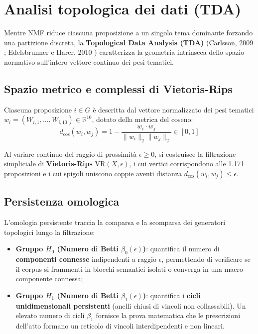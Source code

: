 \documentclass[12pt,a4paper,oneside]{report}
\begin{document}
\section{Analisi topologica dei dati (TDA)}
\label{sec:tda_metodologia}

Mentre NMF riduce ciascuna proposizione a un singolo tema dominante forzando una partizione discreta, la \textbf{Topological Data Analysis (TDA)} (Carlsson, 2009 \cite{carlsson2009topology}; Edelsbrunner e Harer, 2010 \cite{edelsbrunner2010computational}) caratterizza la geometria intrinseca dello spazio normativo sull'intero vettore continuo dei pesi tematici.

\subsection{Spazio metrico e complessi di Vietoris-Rips}
Ciascuna proposizione $i \in G$ è descritta dal vettore normalizzato dei pesi tematici $w_i = (W_{i, 1}, \dots, W_{i, 10}) \in \mathbb{R}^{10}$, dotato della metrica del coseno:
\begin{equation}
    d_{\cos}(w_i, w_j) = 1 - \frac{w_i \cdot w_j}{\|w_i\|_2 \|w_j\|_2} \in [0, 1]
\end{equation}

Al variare continuo del raggio di prossimità $\epsilon \ge 0$, si costruisce la filtrazione simpliciale di \textbf{Vietoris-Rips} $\text{VR}(X, \epsilon)$, i cui vertici corrispondono alle 1.171 proposizioni e i cui spigoli uniscono coppie aventi distanza $d_{\cos}(w_i, w_j) \le \epsilon$.

\subsection{Persistenza omologica}
L'omologia persistente traccia la comparsa e la scomparsa dei generatori topologici lungo la filtrazione:
\begin{itemize}
    \item \textbf{Gruppo $H_0$ (Numero di Betti $\beta_0(\epsilon)$)}: quantifica il numero di \textbf{componenti connesse} indipendenti a raggio $\epsilon$, permettendo di verificare se il corpus si frammenti in blocchi semantici isolati o converga in una macro-componente connessa;
    \item \textbf{Gruppo $H_1$ (Numero di Betti $\beta_1(\epsilon)$)}: quantifica i \textbf{cicli unidimensionali persistenti} (anelli chiusi di vincoli non collassabili). Un elevato numero di cicli $\beta_1$ fornisce la prova matematica che le prescrizioni dell'atto formano un reticolo di vincoli interdipendenti e non lineari.
\end{itemize}
\end{document}
